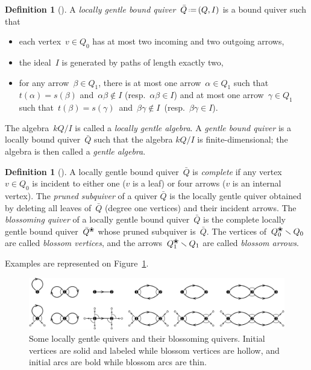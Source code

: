 \documentclass{amsart}
\theoremstyle{definition}
\newtheorem{definition}[theorem]{Definition}
\newcommand{\ssm}{\smallsetminus} %
\newcommand{\eqdef}{\mbox{\,\raisebox{0.2ex}{\scriptsize\ensuremath{\mathrm:}}\ensuremath{=}\,}} %
\newcommand{\fref}[1]{Figure~\ref{#1}} %
\newcommand{\darkblue}{\color{darkblue}} %
\newcommand{\defn}[1]{\textsl{\darkblue #1}} %
\newcommand{\blossom}{^\text{\ding{96}}} %
\begin{document}
\begin{definition}[\cite{ButlerRingel}]
\label{def:gentleQuiver}
A \defn{locally gentle bound quiver}~$\bar Q \eqdef (Q,I)$ is a bound quiver such that
\begin{itemize}
\item each vertex~$v \in Q_0$ has at most two incoming and two outgoing arrows,
\item the ideal~$I$ is generated by paths of length exactly two,
\item for any arrow~$\beta \in Q_1$, there is at most one arrow~$\alpha \in Q_1$ such that~$t(\alpha) = s(\beta)$ and~${\alpha\beta\notin I}$ (resp.~$\alpha\beta \in I$) and at most one arrow~$\gamma \in Q_1$ such that~$t(\beta) = s(\gamma)$~and~${\beta\gamma\notin I}$~(resp.~${\beta\gamma \in I}$).
\end{itemize}
The algebra~$kQ/I$ is called a \defn{locally gentle algebra}.
A \defn{gentle bound quiver} is a locally bound quiver~$\bar Q$ such that the algebra $kQ/I$ is finite-dimensional; the algebra is then called a \defn{gentle algebra}.
\end{definition}

\begin{definition}[\cite{PaluPilaudPlamondon}]
\label{def:blossomingQuiver}
A locally gentle bound quiver~$\bar Q$ is \defn{complete} if any vertex~$v \in Q_0$ is incident to either one ($v$ is a leaf) or four arrows ($v$ is an internal vertex).
The \defn{pruned subquiver} of a quiver $\bar Q$ is the locally gentle quiver obtained by deleting all leaves of~$\bar Q$ (degree one vertices) and their incident arrows.
The \defn{blossoming quiver} of a locally gentle bound quiver~$\bar Q$ is the complete locally gentle bound quiver~$\bar Q\blossom$ whose pruned subquiver is~$\bar Q$.
The vertices of~$Q\blossom_0 \ssm Q_0$ are called \defn{blossom vertices}, and the arrows~$Q\blossom_1 \ssm Q_1$ are called \defn{blossom arrows}.
\end{definition}

Examples are represented on \fref{fig:quivers}.

\begin{figure}[t]
	\capstart
	\centerline{\includegraphics[scale=.4]{quivers}}
	\caption{Some locally gentle quivers and their blossoming quivers. Initial vertices are solid and labeled while blossom vertices are hollow, and initial arcs are bold while blossom arcs are thin.}
	\label{fig:quivers}
\end{figure}
\end{document}
